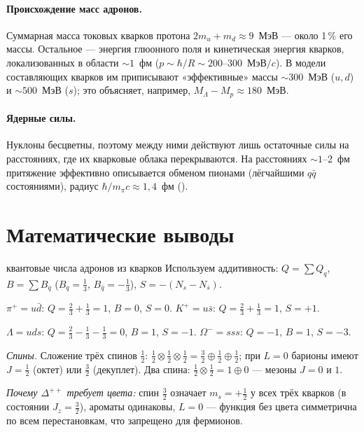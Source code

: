 \paragraph{Происхождение масс адронов.} Суммарная масса токовых кварков протона $2m_u+m_d\approx9$~МэВ — около 1\,\% его массы.
Остальное — энергия глюонного поля и кинетическая энергия кварков, локализованных в области $\sim1$~фм
($p\sim\hbar/R\sim200$--$300$~МэВ$/c$). В модели составляющих кварков им приписывают «эффективные» массы $\sim300$~МэВ
($u,d$) и $\sim500$~МэВ ($s$); это объясняет, например, $M_\Lambda-M_p\approx180$~МэВ.

\paragraph{Ядерные силы.} Нуклоны бесцветны, поэтому между ними действуют лишь остаточные силы на расстояниях, где
их кварковые облака перекрываются. На расстояниях $\sim1$--$2$~фм притяжение эффективно описывается обменом пионами
(лёгчайшими $q\bar q$ состояниями), радиус $\hbar/m_\pi c\approx1{,}4$~фм ().

\section{Математические выводы}

\begin{derivation}[label=der:15:charges]{квантовые числа адронов из кварков}
Используем аддитивность: $Q=\sum Q_q$, $B=\sum B_q$ ($B_q=\frac13$, $B_{\bar q}=-\frac13$), $S=-(N_s-N_{\bar s})$.

$\pi^+=u\bar d$: $Q=\frac23+\frac13=1$, $B=0$, $S=0$. \quad $K^+=u\bar s$: $Q=\frac23+\frac13=1$, $S=+1$.

$\Lambda=uds$: $Q=\frac23-\frac13-\frac13=0$, $B=1$, $S=-1$. \quad $\Omega^-=sss$: $Q=-1$, $B=1$, $S=-3$.

\emph{Спины.} Сложение трёх спинов $\frac12$: $\frac12\otimes\frac12\otimes\frac12=\frac32\oplus\frac12\oplus\frac12$; при $L=0$ барионы имеют
$J=\frac12$ (октет) или $\frac32$ (декуплет). Два спина: $\frac12\otimes\frac12=1\oplus0$ — мезоны $J=0$ и $1$.

\emph{Почему $\Delta^{++}$ требует цвета:} спин $\frac32$ означает $m_s=+\frac12$ у всех трёх кварков (в состоянии $J_z=\frac32$),
ароматы одинаковы, $L=0$ — функция без цвета симметрична по всем перестановкам, что запрещено для фермионов.
\end{derivation}

